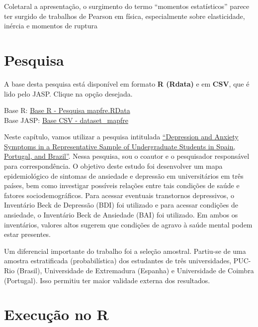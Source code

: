 \documentclass[
]{book}
\newenvironment{base}{
  \definecolor{shadecolor}{rgb}{0.972,0.972,0.972}  %
  \color{black}
  \begin{shaded}}
 {\end{shaded}}
\begin{document}
Coletaral a apresentação, o surgimento do termo ``momentos estatísticos'' parece ter surgido de trabalhos de Pearson em física, especialmente sobre elasticidade, inércia e momentos de ruptura \citep{David1998}

\hypertarget{pesquisa}{%
\section{Pesquisa}\label{pesquisa}}

\begin{base}
A base desta pesquisa está disponível em formato \textbf{R (Rdata)} e em \textbf{CSV}, que é lido pelo JASP. Clique na opção desejada.

Base R: \href{https://github.com/anovabr/mqt/raw/master/bases/Base\%20R\%20-\%20Pesquisa\%20mapfre.RData}{Base R - Pesquisa mapfre.RData}\\
Base JASP: \href{https://github.com/anovabr/mqt/raw/master/bases/bases_csv_jasp.zip}{Base CSV - dataset\_mapfre}

\end{base}

Neste capítulo, vamos utilizar a pesquisa intitulada \href{https://doi.org/10.1590/0102.3772e36412}{``Depression and Anxiety Symptoms in a Representative Sample of Undergraduate Students in Spain, Portugal, and Brazil''}. Nessa pesquisa, sou o coautor e o pesquisador responsável para correspondência. O objetivo deste estudo foi desenvolver um mapa epidemiológico de sintomas de ansiedade e depressão em universitários em três países, bem como investigar possíveis relações entre tais condições de saúde e fatores sociodemográficos. Para acessar eventuais transtornos depressivos, o Inventário Beck de Depressão (BDI) foi utilizado e para acessar condições de ansiedade, o Inventário Beck de Ansiedade (BAI) foi utilizado. Em ambos os inventários, valores altos sugerem que condições de agravo à saúde mental podem estar presentes.

Um diferencial importante do trabalho foi a seleção amostral. Partiu-se de uma amostra estratificada (probabilística) dos estudantes de três universidades, PUC-Rio (Brasil), Universidade de Extremadura (Espanha) e Universidade de Coimbra (Portugal). Isso permitiu ter maior validade externa dos resultados.

\hypertarget{execuuxe7uxe3o-no-r}{%
\section{Execução no R}\label{execuuxe7uxe3o-no-r}}
\end{document}

